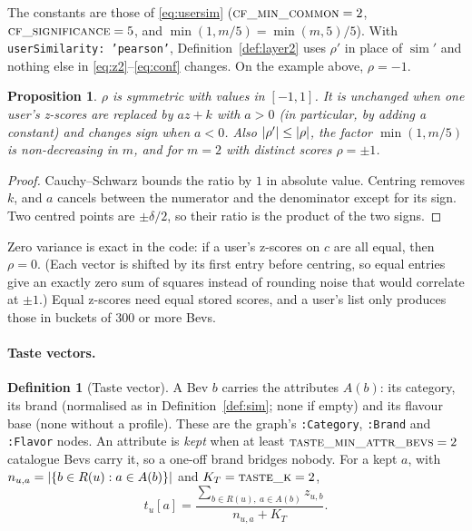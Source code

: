 \documentclass[11pt]{article}
\DeclarePairedDelimiter\abs{\lvert}{\rvert}
\DeclareMathOperator{\simi}{sim}
\newcommand{\code}[1]{\texttt{#1}}
\theoremstyle{plain}
\newtheorem{proposition}[theorem]{Proposition}
\theoremstyle{definition}
\newtheorem{definition}[theorem]{Definition}
\theoremstyle{remark}
\begin{document}
The constants are those of \eqref{eq:usersim} ($\textsc{cf\_min\_common} = 2$, $\textsc{cf\_significance} = 5$, and $\min(1, m/5) = \min(m, 5)/5$). With \code{userSimilarity: 'pearson'}, Definition~\ref{def:layer2} uses $\rho'$ in place of $\simi'$ and nothing else in \eqref{eq:z2}--\eqref{eq:conf} changes. On the example above, $\rho = -1$.

\begin{proposition}\label{prop:pearson}
$\rho$ is symmetric with values in $[-1, 1]$. It is unchanged when one user's z-scores are replaced by $a z + k$ with $a > 0$ (in particular, by adding a constant) and changes sign when $a < 0$. Also $\abs{\rho'} \le \abs{\rho}$, the factor $\min(1, m/5)$ is non-decreasing in $m$, and for $m = 2$ with distinct scores $\rho = \pm 1$.
\end{proposition}
\begin{proof}
Cauchy--Schwarz bounds the ratio by $1$ in absolute value. Centring removes $k$, and $a$ cancels between the numerator and the denominator except for its sign. Two centred points are $\pm \delta / 2$, so their ratio is the product of the two signs.
\end{proof}

Zero variance is exact in the code: if a user's z-scores on $c$ are all equal, then $\rho = 0$. (Each vector is shifted by its first entry before centring, so equal entries give an exactly zero sum of squares instead of rounding noise that would correlate at $\pm 1$.) Equal z-scores need equal stored scores, and a user's list only produces those in buckets of 300 or more Bevs.

\paragraph{Taste vectors.}

\begin{definition}[Taste vector]\label{def:taste}
A Bev $b$ carries the attributes $A(b)$: its category, its brand (normalised as in Definition~\ref{def:sim}; none if empty) and its flavour base (none without a profile). These are the graph's \code{:Category}, \code{:Brand} and \code{:Flavor} nodes. An attribute is \emph{kept} when at least $\textsc{taste\_min\_attr\_bevs} = 2$ catalogue Bevs carry it, so a one-off brand bridges nobody. For a kept $a$, with $n_{u,a} = \abs{\{ b \in R(u) : a \in A(b) \}}$ and $K_T = \textsc{taste\_k} = 2$,
\begin{equation}\label{eq:taste}
t_u[a] = \frac{\sum_{b \in R(u),\ a \in A(b)} z_{u,b}}{n_{u,a} + K_T}.
\end{equation}
\end{definition}
\end{document}
